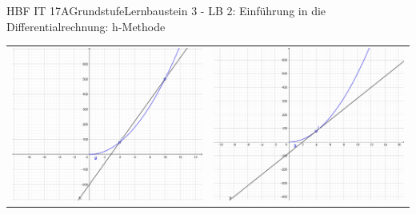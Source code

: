 \documentclass[oneside,openany,headings=optiontotoc,11pt,numbers=noenddot]{scrreprt}
\begin{document}
	\begin{worksheet}{HBF IT 17A}{Grundstufe}{Lernbaustein 3 - LB 2: Einführung in die Differentialrechnung: h-Methode}
		
		\noindent
		\begin{framed}
			\begin{center}
				\begin{tabularx}{\textwidth}{X|X}
					\includegraphics[scale=0.25]{Bilder/Differenzenquotient.jpg} & \includegraphics[scale=0.25]{Bilder/Differentialquotient.jpg}
				\end{tabularx}
			\end{center}
		\end{framed}
	

\end{worksheet}
\end{document}
